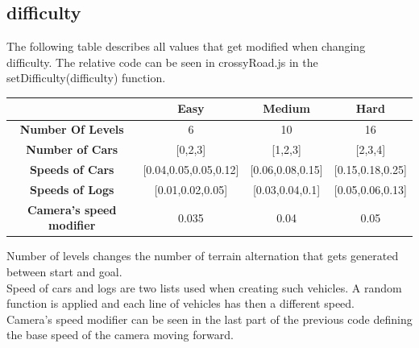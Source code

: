 \documentclass[a4paper, 11pt]{article}
\begin{document}
\subsection{difficulty}
The following table describes all values that get modified when changing difficulty. The relative code can be seen in crossyRoad.js in the 	setDifficulty(difficulty) function.
\begin{table}[h]
\begin{tabular}{c|c|c|c|}
\cline{2-4}
\multicolumn{1}{l|}{}                                  & \textbf{Easy}             & \textbf{Medium}      & \textbf{Hard}        \\ \hline
\multicolumn{1}{|c|}{\textbf{Number Of Levels}}        & 6                         & 10                   & 16                   \\ \hline
\multicolumn{1}{|c|}{\textbf{Number of Cars}}          & {[}0,2,3{]}               & {[}1,2,3{]}          & {[}2,3,4{]}          \\ \hline
\multicolumn{1}{|c|}{\textbf{Speeds of Cars}}          & {[}0.04,0.05,0.05,0.12{]} & {[}0.06,0.08,0.15{]} & {[}0.15,0.18,0.25{]} \\ \hline
\multicolumn{1}{|c|}{\textbf{Speeds of Logs}}          & {[}0.01,0.02,0.05{]}      & {[}0.03,0.04,0.1{]}  & {[}0.05,0.06,0.13{]} \\ \hline
\multicolumn{1}{|c|}{\textbf{Camera's speed modifier}} & 0.035                     & 0.04                 & 0.05                 \\ \hline
\end{tabular}
\end{table}
Number of levels changes the number of terrain alternation that gets generated between start and goal.\\
Speed of cars and logs are two lists used when creating such vehicles. A random function is applied and each line of vehicles has then a different speed.\\
Camera's speed modifier can be seen in the last part of the previous code defining the base speed of the camera moving forward.
\end{document}
